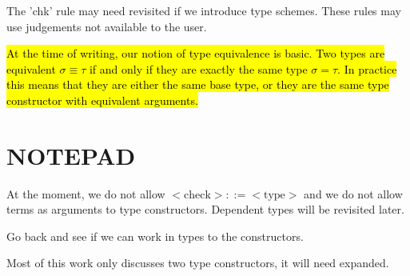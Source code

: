 The 'chk' rule may need revisited if we introduce type schemes. These
rules may use judgements not available to the user.

\hl{At the time of writing, our notion of type equivalence is
  basic. Two types are equivalent $\sigma \equiv \tau$ if and only if they
  are exactly the same type $\sigma = \tau$. In practice this
  means that they are either the same base type, or they are the same
  type constructor with equivalent arguments.}

\section{NOTEPAD}

At the moment, we do not allow $<\mbox{check}> ::= <\mbox{type}>$ and
we do not allow terms as arguments to type constructors. Dependent
types will be revisited later.

Go back and see if we can work in types to the constructors.

Most of this work only discusses two type constructors, it will need
expanded. 
